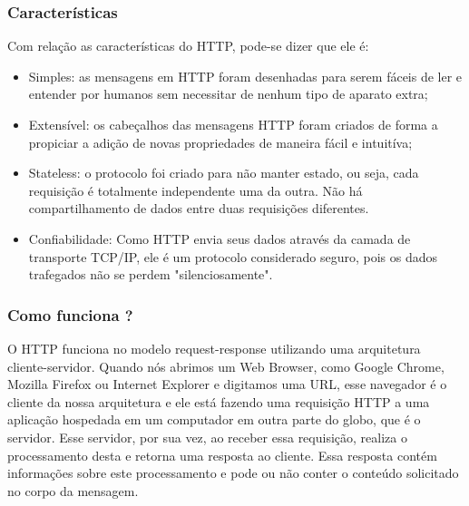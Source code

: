 \subsubsection*{Características}
Com relação as características do HTTP, pode-se dizer que ele é:
\begin{itemize}
\item Simples: as mensagens em HTTP foram desenhadas para serem fáceis de ler e entender por humanos sem necessitar de nenhum tipo de aparato extra;
\item Extensível: os cabeçalhos das mensagens HTTP foram criados de forma a propiciar a adição de novas propriedades de maneira fácil e intuitíva;
\item Stateless: o protocolo foi criado para não manter estado, ou seja, cada requisição é totalmente independente uma da outra. Não há compartilhamento de dados entre duas requisições diferentes.
\item Confiabilidade: Como HTTP envia seus dados através da camada de transporte TCP/IP, ele é um protocolo considerado seguro, pois os dados trafegados não se perdem "silenciosamente". 
\end{itemize}


\subsubsection*{Como funciona ?}
O HTTP funciona no modelo request-response utilizando uma arquitetura cliente-servidor. Quando nós abrimos um Web Browser, como Google Chrome, Mozilla Firefox ou Internet Explorer e digitamos uma URL, esse navegador é o cliente da nossa arquitetura e ele está fazendo uma requisição HTTP a uma aplicação hospedada em um computador em outra parte do globo, que é o servidor. Esse servidor, por sua vez, ao receber essa requisição, realiza o processamento desta e retorna uma resposta ao cliente. Essa resposta contém informações sobre este processamento e pode ou não conter o conteúdo solicitado no corpo da mensagem.

